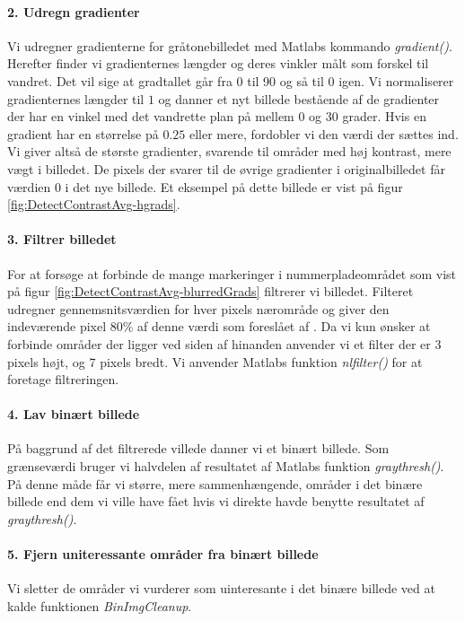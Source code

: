 \paragraph{2. Udregn gradienter}
Vi udregner gradienterne for gråtonebilledet med Matlabs kommando \textit{gradient()}. Herefter finder vi gradienternes længder og deres vinkler målt som forskel til vandret. Det vil sige at gradtallet går fra 0 til 90 og så til 0 igen. Vi normaliserer gradienternes længder til $1$ og danner et nyt billede bestående af de gradienter der har en vinkel med det vandrette plan på mellem $0$ og $30$ grader. Hvis en gradient har en størrelse på $0.25$ eller mere, fordobler vi den værdi der sættes ind. Vi giver altså de største gradienter, svarende til områder med høj kontrast, mere vægt i billedet. De pixels der svarer til de øvrige gradienter i originalbilledet får værdien $0$ i det nye billede. Et eksempel på dette billede er vist på figur \vref{fig:DetectContrastAvg-hgrads}.

\paragraph{3. Filtrer billedet}
For at forsøge at forbinde de mange markeringer i nummerpladeområdet som vist på figur \vref{fig:DetectContrastAvg-blurredGrads} filtrerer vi billedet. Filteret udregner gennemsnitsværdien for hver pixels nærområde og giver den indeværende pixel 80\% af denne værdi som foreslået af \cite{shapiro}. Da vi kun ønsker at forbinde områder der ligger ved siden af hinanden anvender vi et filter der er 3 pixels højt, og 7 pixels bredt. Vi anvender Matlabs funktion \textit{nlfilter()} for at foretage filtreringen.

\paragraph{4. Lav binært billede}
På baggrund af det filtrerede villede danner vi et binært billede. Som grænseværdi bruger vi halvdelen af resultatet af Matlabs funktion \textit{graythresh()}. På denne måde får vi større, mere sammenhængende, områder i det binære billede end dem vi ville have fået hvis vi direkte havde benytte resultatet af \textit{graythresh()}.

\paragraph{5. Fjern uniteressante områder fra binært billede}
Vi sletter de områder vi vurderer som uinteresante i det binære billede ved at kalde funktionen \textit{BinImgCleanup}.

